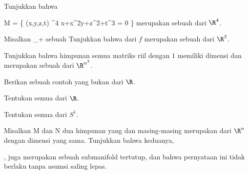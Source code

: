 \setcounter{section}{10}


{}
{

Tunjukkan bahwa

\mavergleichskettedisp
{\vergleichskette
{M
}
{ =} { \left\{ (x,y,z,t) \in \R^4  \mid   x+x^2y+z^2+t^3 = 0         \right\}
}
{ } {
}
{ } {
}
{ } {
}
}
{}{}{}
merupakan sebuah
dari $\R^4$.

}
{} {}

{}
{

Misalkan
 {\R} {\R_+
} {}
sebuah
Tunjukkan bahwa
dari
$f$ merupakan sebuah
dari $\R^{3}$.

}
{} {}

{}
{

Tunjukkan bahwa himpunan semua
 matriks riil dengan
$1$ memiliki dimensi
 dan merupakan sebuah
dari $\R^{n^2}$.

}
{} {}

{}
{

Berikan sebuah contoh
 yang bukan
 dari $\R$.

}
{} {}

{}
{

Tentukan semua
dari $\R$.

}
{} {}

{}
{

Tentukan semua
dari $S^1$.

}
{} {}

{}
{

Misalkan
\mathkor {} {M} {dan} {N} {}
dua himpunan yang
dan masing-masing merupakan
dari $\R^n$ dengan dimensi yang sama. Tunjukkan bahwa
keduanya,

, juga merupakan sebuah submanifold tertutup, dan bahwa pernyataan ini tidak berlaku tanpa asumsi saling lepas.

}
{} {}


